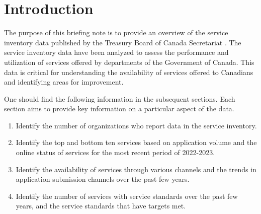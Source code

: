 \section{Introduction}

The purpose of this briefing note is to provide an overview of the service inventory 
data published by the Treasury Board of Canada Secretariat \cite{cite1}. The service 
inventory data have been analyzed to assess the performance and utilization of services 
offered by departments of the Government of Canada. This data is critical for 
understanding the availability of services offered to Canadians and identifying areas 
for improvement.

One should find the following information in the subsequent sections. Each section aims 
to provide key information on a particular aspect of the data. 
\begin{tcolorbox}[title=Key Findings,boxrule=1pt]
    \begin{enumerate}
        \item Identify the number of organizations who report data in the service inventory.

        \item Identify the top and bottom ten services based on application volume and the online status of services for the most recent period of 2022-2023.

        \item Identify the availability of services through various channels and the trends in application submission channels over the past few years.

        \item Identify the number of services with service standards over the past few years, and the service standards that have targets met.
    \end{enumerate}
\end{tcolorbox}